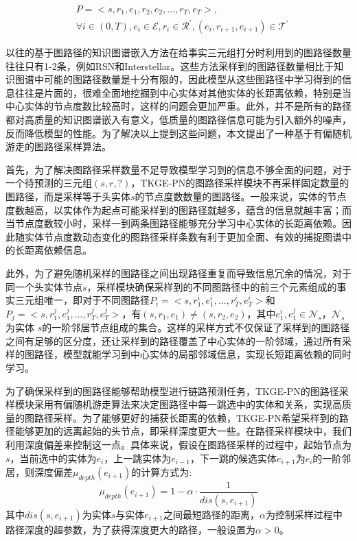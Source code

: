 \begin{equation}
  \begin{aligned}
     &P=<s,r_1,e_1,r_2,e_2,...,r_T,e_T>, \\
     &{\forall}i \in (0,T),e_i\in\mathcal{E},r_i\in\mathcal{R}^{\prime},(e_i,r_{i+1},e_{i+1})\in\mathcal{T}^{\prime}
  \end{aligned}
\end{equation}

以往的基于图路径的知识图谱嵌入方法在给事实三元组打分时利用到的图路径数量往往只有1-2条，例如RSN和Interstellar。这些方法采样到的图路径数量相比于知识图谱中可能的图路径数量是十分有限的，因此模型从这些图路径中学习得到的信息往往是片面的，很难全面地挖掘到中心实体对其他实体的长距离依赖，特别是当中心实体的节点度数比较高时，这样的问题会更加严重。此外，并不是所有的路径都对高质量的知识图谱嵌入有意义，低质量的图路径信息可能为引入额外的噪声，反而降低模型的性能。为了解决以上提到这些问题，本文提出了一种基于有偏随机游走的图路径采样算法。

首先，为了解决图路径采样数量不足导致模型学习到的信息不够全面的问题，对于一个待预测的三元组$(s,r,?)$，TKGE-PN的图路径采样模块不再采样固定数量的图路径，而是采样等于头实体$s$的节点度数数量的图路径。一般来说，实体的节点度数越高，以实体作为起点可能采样到的图路径就越多，蕴含的信息就越丰富；而当节点度数较小时，采样一到两条图路径能够充分学习中心实体的长距离依赖。因此随实体节点度数动态变化的图路径采样条数有利于更加全面、有效的捕捉图谱中的长距离依赖信息。

此外，为了避免随机采样的图路径之间出现路径重复而导致信息冗余的情况，对于同一个头实体节点$s$，采样模块确保采样到的不同图路径中的前三个元素组成的事实三元组唯一，即对于不同图路径$P_i=<s,r_1^{i},e_1^{i},...,r_T^{i},e_T^{i}>$和$P_j=<s,r_1^{j},e_1^{j},...,r_T^{j},e_T^{j}>$，有$(s, r_1, e_1)\neq(s, r_2, e_2)$，其中$e_1^{i},e_1^{j}\in \mathcal{N}_s$，$\mathcal{N}_s$为实体 $s$的一阶邻居节点组成的集合。这样的采样方式不仅保证了采样到的图路径之间有足够的区分度，还让采样到的路径覆盖了中心实体的一阶邻域，通过所有采样的图路径，模型就能学习到中心实体的局部邻域信息，实现长短距离依赖的同时学习。

为了确保采样到的图路径能够帮助模型进行链路预测任务，TKGE-PN的图路径采样模块采用有偏随机游走算法来决定图路径中每一跳选中的实体和关系，实现高质量的图路径采样。为了能够更好的捕获长距离的依赖，TKGE-PN希望采样到的路径能够更加的远离起始的头节点，即采样深度更大一些。在路径采样模块中，我们利用深度偏差来控制这一点。具体来说，假设在图路径采样的过程中，起始节点为$s$，当前选中的实体为$e_i$，上一跳实体为$e_{i-1}$，下一跳的候选实体$e_{i+1}$为$e_i$的一阶邻居，则深度偏差$\mu_{depth}(e_{i+1})$的计算方式为:
\begin{equation}
  \mu_{depth}(e_{i+1})=1-\alpha\cdot\frac{1}{dis(s,e_{i+1})}
\end{equation}
其中$dis(s,e_{i+1})$为实体$s$与实体$e_{i+1}$之间最短路径的距离，$\alpha$为控制采样过程中路径深度的超参数，为了获得深度更大的路径，一般设置为$\alpha>0$。

